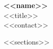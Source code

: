 \documentclass[11pt,letterpaper]{article}
\begin{document}
\begin{center}
    {\Large \textbf{<<name>>}} \\
    \vspace{0.2em}
    {\small <<title>>} \\
    \vspace{0.3em}
    <<contact>>
\end{center}

\vspace{0.5em}

<<sections>>
\end{document}

